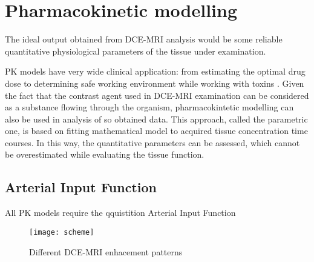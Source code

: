 \chapter{Pharmacokinetic modelling}
\label{chapter:pk}

The ideal output obtained from DCE-MRI analysis would be some reliable quantitative physiological parameters of the tissue under examination. 

PK models have very wide clinical application: from estimating the optimal drug dose to determining safe working environment while working with toxins  \cite{gerlowski1983physiologically}.
Given the fact that the contrast agent used in DCE-MRI examination can be considered as a substance flowing through the organism, pharmacokintetic modelling can also be used in analysis of so obtained data.   
This approach, called the parametric one, is based on fitting mathematical model to acquired tissue concentration time courses. In this way, the quantitative parameters can be assessed, which cannot be overestimated while evaluating the tissue function. 


\section{Arterial Input Function}
All PK models require the qquistition Arterial Input Function


\begin{comment}
The time-dependent distribution and disposition of a substance in a living system can be described by phamacokinetic (PK) models~\cite{gerlowski1983physiologically}. They aim to characterise a physiologic system by decomposing them into interacting compartments. Every of them is a homogenous, well-mixed space with the uniform tracer distribution \cite{PMID:20540902}.









The compartment PK models decribe complex
blood-tissue exchanges and their theory
is based on the differential mass balance equations
[29]. An example of the system decribed
by two compartments is presented on Figure 5.
	


\end{comment}

\begin{figure}
		\centering
		\texttt{[image: scheme]}
		\caption [DCE-MRI enhacement patterns]{Different DCE-MRI enhacement patterns \cite{khalifa2014models}}
		\label{fig:pk_draft}
	\end{figure}